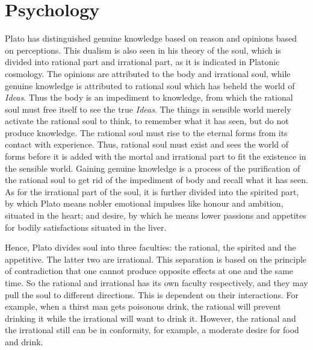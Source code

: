 \documentclass[11pt]{article}
\begin{document}
\section{Psychology}
Plato has distinguished genuine knowledge based on reason and opinions based on perceptions. 
This dualism is also seen in his theory of the soul, which is divided into rational part and irrational part, as it is indicated in Platonic cosmology. 
The opinions are attributed to the body and irrational soul, while genuine knowledge is attributed to rational soul which has beheld the world of \textit{Ideas}. 
Thus the body is an impediment to knowledge, from which the rational soul must free itself to see the true \textit{Ideas}. 
The things in sensible world merely activate the rational soul to think, to remember what it has seen, but do not produce knowledge. 
The rational soul must rise to the eternal forms from its contact with experience. 
Thus, rational soul must exist and sees the world of forms before it is added with the mortal and irrational part to fit the existence in the sensible world. 
Gaining genuine knowledge is a process of the purification of the rational soul to get rid of the impediment of body and recall what it has seen. 
As for the irrational part of the soul, it is further divided into the spirited part, by which Plato means nobler emotional impulses like honour and ambition, situated in the heart; 
and desire, by which he means lower passions and appetites for bodily satisfactions situated in the liver.

\newline

Hence, Plato divides soul into three faculties: the rational, the spirited and the appetitive. 
The latter two are irrational. 
This separation is based on the principle of contradiction that one cannot produce opposite effects at one and the same time. 
So the rational and irrational has its own faculty respectively, and they may pull the soul to different directions. 
This is dependent on their interactions. 
For example, when a thirst man gets poisonous drink, the rational will prevent drinking it while the irrational will want to drink it. 
However, the rational and the irrational still can be in conformity, for example, a moderate desire for food and drink.
  
\end{document}
